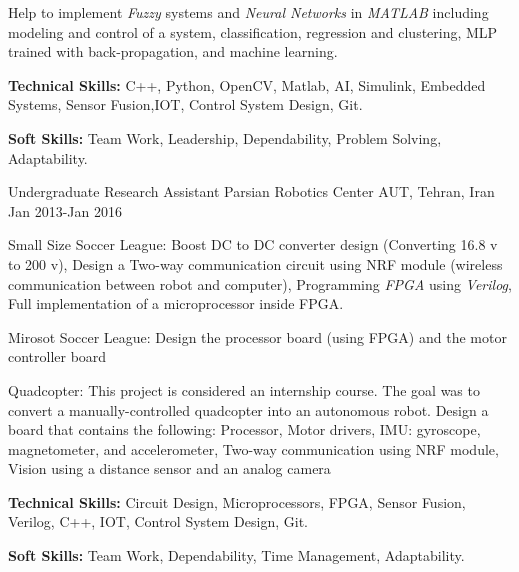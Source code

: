 \begin{cventries}
{\begin{cvitems}
          \item {Help to implement \textit{Fuzzy} systems and \textit{Neural Networks} in \textit{MATLAB} including modeling and control of a system, classification, regression and clustering, MLP trained with back-propagation, and machine learning.}
        \item {\textbf{Technical Skills:} C++, Python, OpenCV, Matlab, AI, Simulink, Embedded Systems, Sensor Fusion,IOT, Control System Design, Git.}
        \item {\textbf{Soft Skills:} Team Work, Leadership, Dependability, Problem Solving, Adaptability.}
      \end{cvitems}
    }   
  \cventry
 {Undergraduate Research Assistant}  %
    {Parsian Robotics Center} %
    {AUT, Tehran, Iran} %
    {Jan 2013-Jan 2016} %
    {
          \begin{cvitems} %
            \item {Small Size Soccer League:	Boost DC to DC converter design (Converting 16.8 v to 200 v),	Design a Two-way communication circuit using NRF module (wireless communication between robot and computer), Programming \textit{FPGA} using \textit{Verilog}, Full implementation of a microprocessor inside FPGA.}
            \item {Mirosot Soccer League:	Design the processor board (using FPGA) and the motor controller board}
            \item{Quadcopter: This project is considered an internship course. The goal was to convert a manually-controlled quadcopter into an autonomous robot. Design a board that contains the following: Processor, Motor drivers, IMU: gyroscope, magnetometer, and accelerometer, Two-way communication using NRF module, Vision using a distance sensor and an analog camera}
            \item {\textbf{Technical Skills:} Circuit Design, Microprocessors, FPGA, Sensor Fusion, Verilog, C++, IOT, Control System Design, Git.}
        \item {\textbf{Soft Skills:} Team Work, Dependability, Time Management, Adaptability.}
          \end{cvitems}
    }   
\end{cventries}



